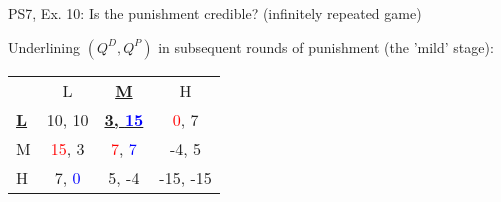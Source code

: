 \begin{frame}{PS7, Ex. 10: Is the punishment credible? (infinitely repeated game)}
\begin{multicols}{2}
      Underlining $(Q^D,Q^P)$ in subsequent rounds of punishment (the 'mild' stage):
      \vspace{-6pt}
      \begin{table}
        \begin{tabular}{l|c|c|c|}
          \multicolumn{1}{c}{} & \multicolumn{1}{c}{L} & \multicolumn{1}{c}{\textbf{\underline{M}}} & \multicolumn{1}{c}{H} \\\cline{2-4}
          \textbf{\underline{L}} & 10, 10 & \textbf{\underline{3, \textcolor{blue}{15}}} & \textcolor{red}{0}, 7 \\\cline{2-4}
          M & \textcolor{red}{15}, 3 & \textcolor{red}{7}, \textcolor{blue}{7} & -4, 5 \\\cline{2-4}
          H & 7, \textcolor{blue}{0} & 5, -4 & -15, -15 \\\cline{2-4}
        \end{tabular}
      \end{table}
      \vfill\null
    \end{multicols}
    \vfill\null
\end{frame}


